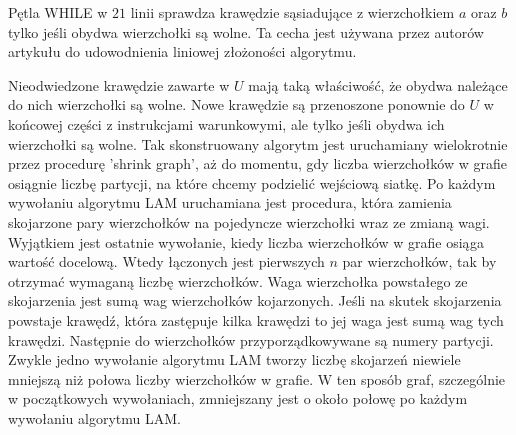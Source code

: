 Pętla WHILE w $21$ linii sprawdza krawędzie sąsiadujące z wierzchołkiem $a$ oraz $b$ tylko jeśli obydwa wierzchołki są wolne.
Ta cecha jest używana przez autorów artykułu do udowodnienia liniowej złożoności algorytmu.

Nieodwiedzone krawędzie zawarte w $U$ mają taką właściwość, że obydwa należące do nich wierzchołki są wolne.
Nowe krawędzie są przenoszone ponownie do $U$ w końcowej części z instrukcjami warunkowymi, ale tylko jeśli obydwa ich
wierzchołki są wolne.
Tak skonstruowany algorytm jest uruchamiany wielokrotnie przez procedurę 'shrink graph', aż do momentu, gdy liczba
wierzchołków w grafie osiągnie liczbę partycji, na które chcemy podzielić wejściową siatkę.
Po każdym wywołaniu algorytmu LAM uruchamiana jest procedura, która zamienia skojarzone pary wierzchołków na pojedyncze
wierzchołki wraz ze zmianą wagi.
Wyjątkiem jest ostatnie wywołanie, kiedy liczba wierzchołków w grafie osiąga wartość docelową.
Wtedy łączonych jest
pierwszych $n$ par wierzchołków, tak by otrzymać wymaganą liczbę wierzchołków.
Waga wierzchołka powstałego ze skojarzenia jest sumą wag wierzchołków kojarzonych.
Jeśli na skutek skojarzenia powstaje krawędź,
która zastępuje kilka krawędzi to jej waga jest sumą wag tych krawędzi.
Następnie do wierzchołków przyporządkowywane są numery partycji.
Zwykle jedno wywołanie algorytmu LAM
tworzy liczbę skojarzeń niewiele mniejszą niż połowa liczby wierzchołków w grafie.
W ten sposób graf, szczególnie w początkowych wywołaniach, zmniejszany jest o około połowę po każdym wywołaniu algorytmu LAM.
\vspace{mm}
